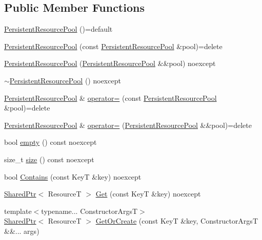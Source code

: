 \subsection*{Public Member Functions}
\begin{DoxyCompactItemize}
\item 
\hyperlink{classmage_1_1_persistent_resource_pool_a23b83adf594628b93c368a2da7660ef8}{Persistent\+Resource\+Pool} ()=default
\item 
\hyperlink{classmage_1_1_persistent_resource_pool_af49749cabca4e6e16b2c073f6f550e0b}{Persistent\+Resource\+Pool} (const \hyperlink{classmage_1_1_persistent_resource_pool}{Persistent\+Resource\+Pool} \&pool)=delete
\item 
\hyperlink{classmage_1_1_persistent_resource_pool_acf26c05e2e6031720fa92fb0cec0d398}{Persistent\+Resource\+Pool} (\hyperlink{classmage_1_1_persistent_resource_pool}{Persistent\+Resource\+Pool} \&\&pool) noexcept
\item 
\hyperlink{classmage_1_1_persistent_resource_pool_a13bb68c8a9f8c37f9f217aea2625935a}{$\sim$\+Persistent\+Resource\+Pool} () noexcept
\item 
\hyperlink{classmage_1_1_persistent_resource_pool}{Persistent\+Resource\+Pool} \& \hyperlink{classmage_1_1_persistent_resource_pool_a796e9dbb12e2756412c50117a6a67f86}{operator=} (const \hyperlink{classmage_1_1_persistent_resource_pool}{Persistent\+Resource\+Pool} \&pool)=delete
\item 
\hyperlink{classmage_1_1_persistent_resource_pool}{Persistent\+Resource\+Pool} \& \hyperlink{classmage_1_1_persistent_resource_pool_adcec8a286b15174ee99200b68ba0589e}{operator=} (\hyperlink{classmage_1_1_persistent_resource_pool}{Persistent\+Resource\+Pool} \&\&pool)=delete
\item 
bool \hyperlink{classmage_1_1_persistent_resource_pool_a9a5669551c15823b817b3c4716a5a52c}{empty} () const noexcept
\item 
size\+\_\+t \hyperlink{classmage_1_1_persistent_resource_pool_a97dee6f5087b59f3e5b4fe14dca74b40}{size} () const noexcept
\item 
bool \hyperlink{classmage_1_1_persistent_resource_pool_a92af0c4a200ea217b831d89cfc321557}{Contains} (const KeyT \&key) noexcept
\item 
\hyperlink{namespacemage_a1e01ae66713838a7a67d30e44c67703e}{Shared\+Ptr}$<$ ResourceT $>$ \hyperlink{classmage_1_1_persistent_resource_pool_ad8d5e096f7f9f0446993b83fe1767fd3}{Get} (const KeyT \&key) noexcept
\item 
{\footnotesize template$<$typename... Constructor\+ArgsT$>$ }\\\hyperlink{namespacemage_a1e01ae66713838a7a67d30e44c67703e}{Shared\+Ptr}$<$ ResourceT $>$ \hyperlink{classmage_1_1_persistent_resource_pool_a009e1629ff0b1aab01a1b0483c6e1e64}{Get\+Or\+Create} (const KeyT \&key, Constructor\+ArgsT \&\&... args)

\end{DoxyCompactItemize}
